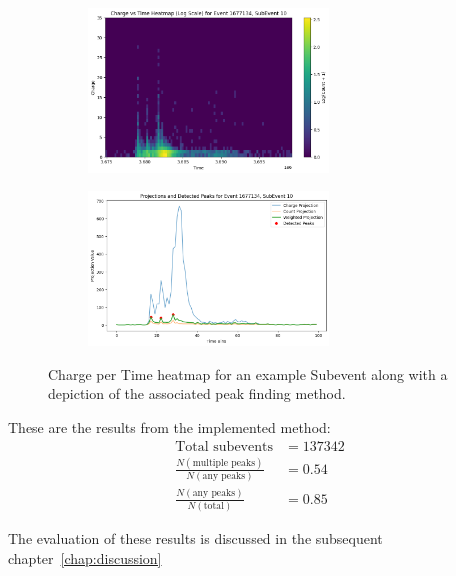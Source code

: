 \begin{figure}[ht]
    \centering
    \begin{subfigure}[b]{\textwidth}
        \centering
        \includegraphics[width=0.7\textwidth]{Plots/peak_heat_1.pdf.png}
    \end{subfigure}
    \vspace{1em} %
    \begin{subfigure}[b]{\textwidth}
        \centering
        \includegraphics[width=0.7\textwidth]{Plots/peak_plot_1.png}
    \end{subfigure}
    \caption{Charge per Time heatmap for an example Subevent along with a depiction of the associated peak finding method.}
    \label{fig:find_peaks}
\end{figure}

These are the results from the implemented method:
\begin{align}
    \text{Total subevents} &= 137342 \\
    \frac{N(\text{multiple peaks})}{N(\text{any peaks})} &= 0.54 \\
    \frac{N(\text{any peaks})}{N(\text{total})} &= 0.85
\end{align}

The evaluation of these results is discussed in the subsequent chapter~\ref{chap:discussion}










